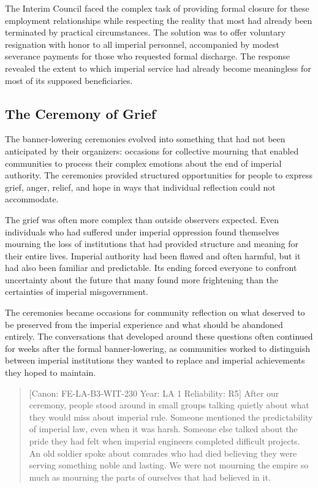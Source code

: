 The Interim Council faced the complex task of providing formal closure
for these employment relationships while respecting the reality that
most had already been terminated by practical circumstances. The
solution was to offer voluntary resignation with honor to all imperial
personnel, accompanied by modest severance payments for those who
requested formal discharge. The response revealed the extent to which
imperial service had already become meaningless for most of its supposed
beneficiaries.

\subsection{The Ceremony of Grief}\label{the-ceremony-of-grief}

The banner-lowering ceremonies evolved into something that had not been
anticipated by their organizers: occasions for collective mourning that
enabled communities to process their complex emotions about the end of
imperial authority. The ceremonies provided structured opportunities for
people to express grief, anger, relief, and hope in ways that individual
reflection could not accommodate.

The grief was often more complex than outside observers expected. Even
individuals who had suffered under imperial oppression found themselves
mourning the loss of institutions that had provided structure and
meaning for their entire lives. Imperial authority had been flawed and
often harmful, but it had also been familiar and predictable. Its ending
forced everyone to confront uncertainty about the future that many found
more frightening than the certainties of imperial misgovernment.

The ceremonies became occasions for community reflection on what
deserved to be preserved from the imperial experience and what should be
abandoned entirely. The conversations that developed around these
questions often continued for weeks after the formal banner-lowering, as
communities worked to distinguish between imperial institutions they
wanted to replace and imperial achievements they hoped to maintain.

\begin{quote}
{[}Canon: FE-LA-B3-WIT-230 \textbar{} Year: LA 1 \textbar{} Reliability:
R5{]} After our ceremony, people stood around in small groups talking
quietly about what they would miss about imperial rule. Someone
mentioned the predictability of imperial law, even when it was harsh.
Someone else talked about the pride they had felt when imperial
engineers completed difficult projects. An old soldier spoke about
comrades who had died believing they were serving something noble and
lasting. We were not mourning the empire so much as mourning the parts
of ourselves that had believed in it.
\end{quote}

